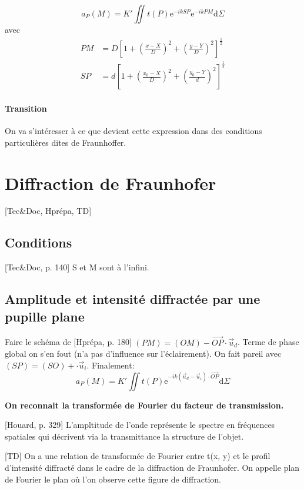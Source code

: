 \documentclass[11pt]{report}
\numberwithin{figure}{section}
\numberwithin{equation}{section}
\numberwithin{table}{section}
\newcommand{\ud}{\mathrm{d}}
\newcommand{\e}{\mathrm{e}}
\newcommand{\1}{\boldsymbol{1}}
\begin{document}
\begin{equation}
a_P(M) = K' \iint t(P) \e^{-i k SP} \e^{-i k PM}\ud \Sigma
\end{equation}
avec 
\begin{align}
PM &= D \left[1 + (\frac{x-X}{D})^2 + (\frac{y-Y}{D})^2\right]^{\frac{1}{2}} \\
SP &= d \left[1 + (\frac{x_0-X}{D})^2 + (\frac{y_0-Y}{d})^2\right]^{\frac{1}{2}}
\end{align}


\paragraph{Transition} On va s'intéresser à ce que devient cette expression dans des conditions particulières dites de Fraunhoffer.

\section{Diffraction de Fraunhofer}

[Tec\&Doc, Hprépa, TD]

\subsection{Conditions}

[Tec\&Doc, p. 140] S et M sont à l'infini.

\subsection{Amplitude et intensité diffractée par une pupille plane}

Faire le schéma de [Hprépa, p. 180]
$(PM) = (OM) - \vec{OP} \cdot \vec{u}_d$. Terme de phase global on s'en fout (n'a pas d'influence sur l'éclairement). On fait pareil avec $(SP) =(SO) +  \cdot \vec{u}_i$. Finalement:
\begin{equation}
a_P(M) = K' \iint t(P) \e^{-i k (\vec{u}_d-\vec{u}_i) \cdot \vec{OP}} \ud \Sigma
\end{equation}

\textbf{On reconnait la transformée de Fourier du facteur de transmission.}

[Houard, p. 329] L'ampltitude de l'onde représente le spectre en fréquences spatiales qui décrivent via la transmittance la structure de l'objet.

[TD] On a une relation de transformée de Fourier entre t(x, y) et le profil d’intensité diffracté dans le cadre de la diffraction de Fraunhofer. On appelle plan de Fourier le plan où l’on observe cette figure de diffraction.
\end{document}
